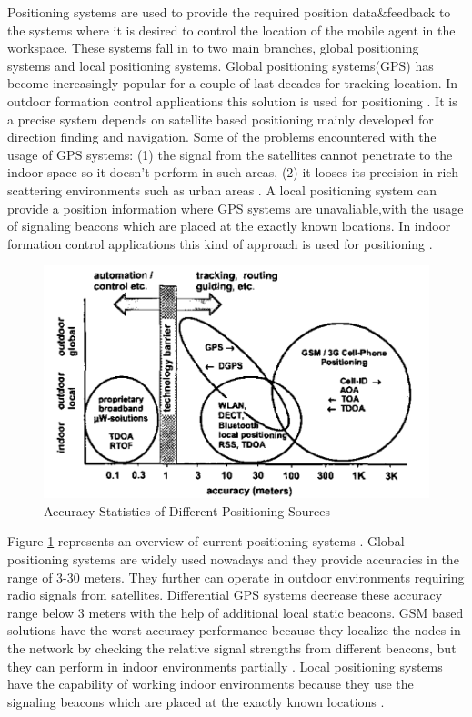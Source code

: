 Positioning systems are used to provide the required position data$\&$feedback to the systems where it is desired to control the location of the mobile agent in the workspace. 
These systems fall in to two main branches, global positioning systems and local positioning systems. Global positioning systems(GPS) has become increasingly popular for a couple of last decades for tracking location. In outdoor formation control applications this solution is used for positioning \cite{29}. It is a precise system depends on satellite based positioning mainly developed for direction finding and navigation.  Some of the problems encountered with the usage of GPS systems: (1) the signal from the satellites cannot penetrate to the indoor space so it doesn't perform in such areas, (2) it looses its precision in rich scattering environments such as urban areas \cite{19}.  A local positioning system can provide a position information where GPS systems are unavaliable,with the usage of signaling beacons which are placed at the exactly known locations. In indoor formation control applications this kind of approach is used for positioning \cite{96}. 




\begin{figure}[H]
	\caption{Accuracy Statistics of Different Positioning Sources \cite{20}} \label{overview_position}
	\centering
	\includegraphics[scale = 0.4]{gps}
\end{figure} 

Figure \ref{overview_position} represents an overview of current positioning systems \cite{20}. Global positioning systems are widely used nowadays and they provide accuracies in the range of 3-30 meters. They further can operate in outdoor environments requiring radio signals from satellites. Differential GPS systems decrease these accuracy range below 3 meters with the help of additional local static beacons. GSM based solutions have the worst accuracy performance because they localize the nodes in the network by checking the relative signal strengths from different beacons, but they can perform in indoor environments partially \cite{20}.  Local positioning systems have the capability of working indoor environments because they use the signaling beacons which are placed at the exactly known locations \cite{20}. 

